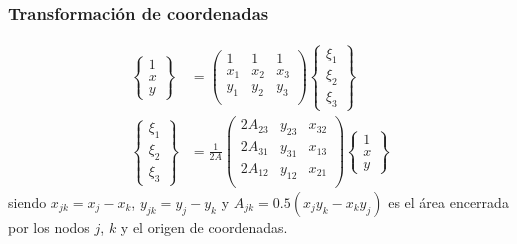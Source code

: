 \documentclass[handout]{beamer}
\begin{document}
\begin{frame}
	\frametitle{Transformación de coordenadas}
	\begin{align}
		\left\{
		\begin{array}{c}
			1 \\
			x \\
			y
		\end{array}
		\right\}
		&=
		\left(
		\begin{array}{ccc}
			1   & 1   & 1   \\
			x_1 & x_2 & x_3 \\
			y_1 & y_2 & y_3 \\
		\end{array}
		\right)
		\left\{
		\begin{array}{c}
			\xi_1 \\
			\xi_2 \\
			\xi_3
		\end{array}
		\right\} \label{cstxxi} \\
		\left\{
		\begin{array}{c}
			\xi_1 \\
			\xi_2 \\
			\xi_3
		\end{array}
		\right\}
		&=\frac{1}{2A}
		\left(
		\begin{array}{ccc}
			2A_{23} & y_{23} & x_{32} \\
			2A_{31} & y_{31} & x_{13} \\
			2A_{12} & y_{12} & x_{21} \\
		\end{array}
		\right)
		\left\{
		\begin{array}{c}
			1 \\
			x \\
			y
		\end{array}
		\right\} \label{cstxix}
	\end{align}
	siendo $x_{jk}=x_j-x_k$, $y_{jk}=y_j-y_k$ y $A_{jk}=0.5(x_jy_k-x_ky_j)$ es el 
	área encerrada por los nodos $j$, $k$ y el origen de coordenadas.
\end{frame}
\end{document}
